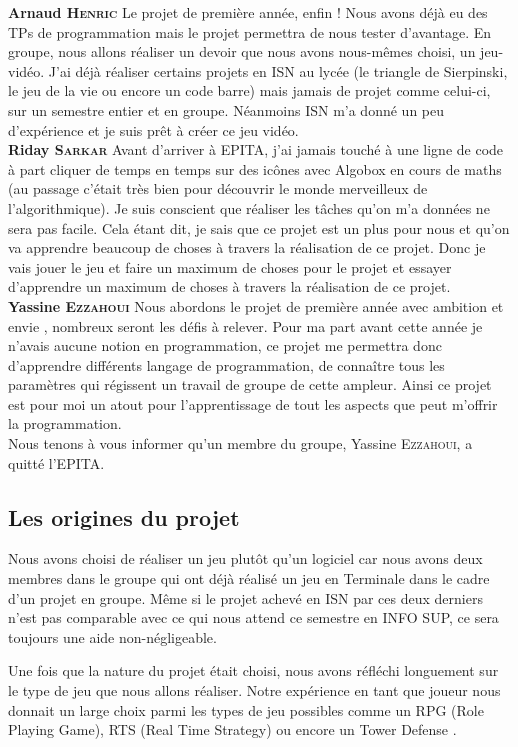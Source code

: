 \documentclass[a4paper, 12pt]{article}
\begin{document}
	\parindent=0cm\textbf{Arnaud \textsc{Henric}}
	\smallbreak
	Le projet de première année, enfin ! Nous avons déjà eu des TPs de programmation mais le projet permettra de nous tester d’avantage. En groupe, nous allons réaliser un devoir que nous avons nous-mêmes choisi, un jeu-vidéo. J’ai déjà réaliser certains projets en ISN au lycée (le triangle de Sierpinski, le jeu de la vie ou encore un code barre) mais jamais de projet comme celui-ci, sur un semestre entier et en groupe. Néanmoins ISN m’a donné un peu d'expérience et je suis prêt à créer ce jeu vidéo.\\
\newpage	
	\parindent=0cm\textbf{Riday \textsc{Sarkar}}
	\smallbreak
 Avant d’arriver à EPITA,  j'ai jamais touché à une ligne de code à part cliquer de temps en temps sur des icônes avec Algobox en cours de maths (au passage c'était très bien pour découvrir  le monde merveilleux de l’algorithmique). Je suis conscient que réaliser les tâches qu’on m’a données ne sera pas facile. Cela étant dit, je sais que ce projet est un plus pour nous et qu’on va apprendre beaucoup de choses à travers la réalisation de ce projet. Donc je vais jouer le jeu et faire un maximum de choses pour le projet et essayer d’apprendre un maximum de choses à travers la réalisation de ce projet.\\

	\parindent=0cm\textbf{Yassine \textsc{Ezzahoui}}
	\smallbreak
	Nous abordons  le projet de première année avec ambition et envie , nombreux seront les défis à relever. Pour ma part avant cette année je n’avais aucune notion en programmation, ce projet me permettra donc d’apprendre différents langage de programmation,  de connaître tous les paramètres qui régissent un travail de groupe de cette ampleur. Ainsi ce  projet est pour moi  un atout pour l’apprentissage de tout les aspects que peut m'offrir la programmation.\\
	
	Nous tenons à vous informer qu'un membre du groupe, Yassine \textsc{Ezzahoui}, a quitt\'e l'EPITA.   

	\parindent=0.5cm 
	\subsection{Les origines du projet}
Nous avons choisi de réaliser un jeu plutôt qu’un logiciel car nous avons deux membres dans le groupe qui ont déjà réalisé un jeu en Terminale dans le cadre d’un projet en groupe. Même si le projet achevé en ISN par ces deux derniers n’est pas comparable avec ce qui nous attend ce semestre en INFO SUP, ce sera toujours une aide non-négligeable.
\par Une fois que la nature du projet était choisi, nous avons réfléchi longuement sur le type de jeu que nous allons réaliser. Notre expérience en tant que joueur nous donnait un large choix parmi les types de jeu possibles comme un RPG (Role Playing Game), RTS (Real Time Strategy) ou encore un Tower Defense . 
\end{document}
